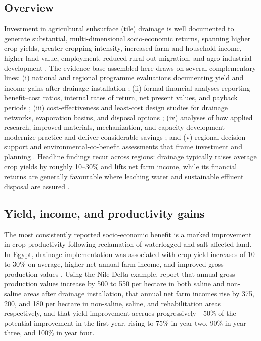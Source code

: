 \subsection{Overview}
Investment in agricultural subsurface (tile) drainage is well documented to generate substantial, multi-dimensional socio-economic returns, spanning higher crop yields, greater cropping intensity, increased farm and household income, higher land value, employment, reduced rural out-migration, and agro-industrial development \parencite{Gopalakrishnan2007,AbdelDayem2007}. The evidence base assembled here draws on several complementary lines: (i) national and regional programme evaluations documenting yield and income gains after drainage installation \parencite{AbdelDayem2007,Gopalakrishnan2007,Datta2000,Datta2002,Ghumman2011,Wichelns2002}; (ii) formal financial analyses reporting benefit--cost ratios, internal rates of return, net present values, and payback periods \parencite{Gopalakrishnan2007,Datta2000,Datta2002,Wichelns2002,Ghumman2011,ROBINSON1992,Bozic2014}; (iii) cost-effectiveness and least-cost design studies for drainage networks, evaporation basins, and disposal options \parencite{Gabr2024,Singh2001,Bakour2021,Bethune2008,HANSON1994,DINAR1989,Napierala2024,Imran2021}; (iv) analyses of how applied research, improved materials, mechanization, and capacity development modernize practice and deliver considerable savings \parencite{Ritzema2007,Ritzema2008,Ritzema2006,AbdelDayem2007,TeKrony2004,Yannopoulos2020}; and (v) regional decision-support and environmental-co-benefit assessments that frame investment and planning \parencite{Burkhalter2006,ROBINSON1992,Quinn2009,Letey1999,McDowell2021,Upadhyay2019,Ayars2015}. Headline findings recur across regions: drainage typically raises average crop yields by roughly 10--30\% and lifts net farm income, while its financial returns are generally favourable where leaching water and sustainable effluent disposal are assured \parencite{AbdelDayem2007,Datta2000,Wichelns2002}.

\subsection{Yield, income, and productivity gains}
The most consistently reported socio-economic benefit is a marked improvement in crop productivity following reclamation of waterlogged and salt-affected land. In Egypt, drainage implementation was associated with crop yield increases of 10 to 30\% on average, higher net annual farm income, and improved gross production values \parencite{AbdelDayem2007}. Using the Nile Delta example, \textcite{Wichelns2002} report that annual gross production values increase by 500 to 550 per hectare in both saline and non-saline areas after drainage installation, that annual net farm incomes rise by 375, 200, and 180 per hectare in non-saline, saline, and rehabilitation areas respectively, and that yield improvement accrues progressively---50\% of the potential improvement in the first year, rising to 75\% in year two, 90\% in year three, and 100\% in year four.


